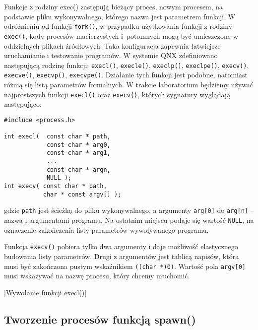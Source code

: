 Funkcje z rodziny exec() zastępują bieżący proces, nowym procesem, na podstawie
pliku wykonywalnego, którego nazwa jest parametrem funkcji. W odróżnieniu od
funkcji \texttt{fork()},  w przypadku użytkowania funkcji z rodziny
\texttt{exec()}, kody procesów macierzystych i potomnych mogą być umieszczone w
oddzielnych plikach źródłowych. Taka konfiguracja zapewnia łatwiejsze
uruchamianie i testowanie programów. W systemie QNX zdefiniowano następującą
rodzinę funkcji: \texttt{execl()}, \texttt{execle()}, \texttt{execlp()},
\texttt{execlpe()}, \texttt{execv()}, \texttt{execve()}, \texttt{execvp()},
\texttt{execvpe()}. Działanie tych funkcji jest podobne, natomiast różnią się
listą parametrów formalnych. W trakcie laboratorium będziemy używać
najprostszych funkcji \texttt{execl()} oraz \texttt{execv()}, których sygnatury
wyglądają następująco:

\begin{lstlisting}[style=MyCStyle]
#include <process.h>

int execl(  const char * path,
            const char * arg0,
            const char * arg1,
            ...
            const char * argn,
            NULL );
int execv( const char * path,
           char * const argv[] );
\end{lstlisting}

gdzie \texttt{path} jest ścieżką do pliku wykonywalnego, a argumenty
\texttt{arg[0]} do \texttt{arg[n]} -- nazwą i argumentami programu. Na ostatnim
miejscu podaje się wartość \texttt{NULL}, na oznaczenie zakończenia listy
parametrów wywoływanego programu.

Funkcja \texttt{execv()} pobiera tylko dwa argumenty i daje możliwość
elastycznego budowania listy parametrów. Drugi z argumentów jest tablicą
napisów, która musi być zakończona pustym wskaźnikiem \texttt{((char *)0)}.
Wartość pola \texttt{argv[0]} musi wskazywać na nazwę procesu, który chcemy
uruchomić.

\begin{example}{[Wywołanie funkcji execl()]}
  \label{ex:WHF3V}
  
\end{example}

\subsection{Tworzenie procesów funkcją spawn()}

